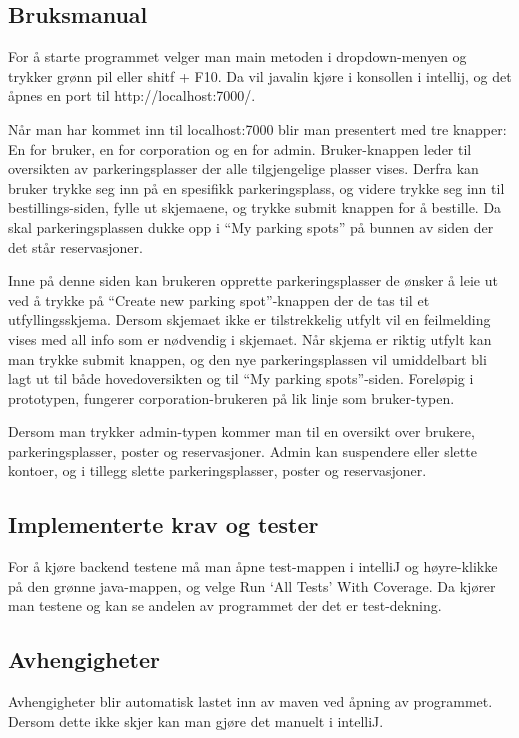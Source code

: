\documentclass[12pt]{article}
\begin{document}
    \subsection{Bruksmanual}
    For å starte programmet velger man main metoden i dropdown-menyen og trykker grønn pil eller shitf + F10. Da vil javalin kjøre i konsollen i intellij, og det åpnes en port til http://localhost:7000/.
    
    Når man har kommet inn til localhost:7000 blir man presentert med tre knapper: En for bruker, en for corporation og en for admin. Bruker-knappen leder til oversikten av parkeringsplasser der alle tilgjengelige plasser vises. Derfra kan bruker trykke seg inn på en spesifikk parkeringsplass, og videre trykke seg inn til bestillings-siden, fylle ut skjemaene, og trykke submit knappen for å bestille. Da skal parkeringsplassen dukke opp i “My parking spots” på bunnen av siden der det står reservasjoner.
    
    Inne på denne siden kan brukeren opprette parkeringsplasser de ønsker å leie ut ved å trykke på “Create new parking spot”-knappen der de tas til et utfyllingsskjema. Dersom skjemaet ikke er tilstrekkelig utfylt vil en feilmelding vises med all info som er nødvendig i skjemaet. Når skjema er riktig utfylt kan man trykke submit knappen, og den nye parkeringsplassen vil umiddelbart bli lagt ut til både hovedoversikten og til “My parking spots”-siden. Foreløpig i prototypen, fungerer corporation-brukeren på lik linje som bruker-typen.
    
    Dersom man trykker admin-typen kommer man til en oversikt over brukere, parkeringsplasser, poster og reservasjoner. Admin kan suspendere eller slette kontoer, og i tillegg slette parkeringsplasser, poster og reservasjoner.

    \subsection{Implementerte krav og tester}
    For å kjøre backend testene må man åpne test-mappen i intelliJ og høyre-klikke på den grønne java-mappen, og velge Run ‘All Tests’ With Coverage. Da kjører man testene og kan se andelen av programmet der det er test-dekning.

    \subsection{Avhengigheter}
    Avhengigheter blir automatisk lastet inn av maven ved åpning av programmet. Dersom dette ikke skjer kan man gjøre det manuelt i intelliJ.
\end{document}
